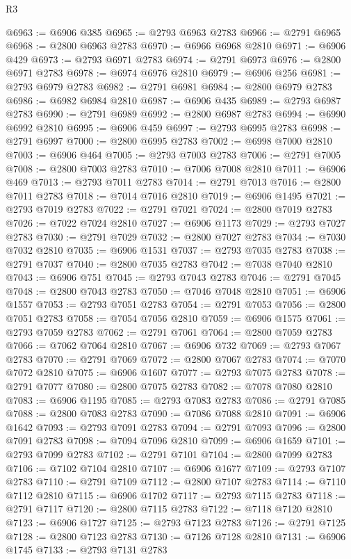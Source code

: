 \begin{lexlean}{R3}
\begin{coremodule}
@6963 := @6906 @385
@6965 := @2793 @6963 @2783
@6966 := @2791 @6965
@6968 := @2800 @6963 @2783
@6970 := @6966 @6968 @2810
@6971 := @6906 @429
@6973 := @2793 @6971 @2783
@6974 := @2791 @6973
@6976 := @2800 @6971 @2783
@6978 := @6974 @6976 @2810
@6979 := @6906 @256
@6981 := @2793 @6979 @2783
@6982 := @2791 @6981
@6984 := @2800 @6979 @2783
@6986 := @6982 @6984 @2810
@6987 := @6906 @435
@6989 := @2793 @6987 @2783
@6990 := @2791 @6989
@6992 := @2800 @6987 @2783
@6994 := @6990 @6992 @2810
@6995 := @6906 @459
@6997 := @2793 @6995 @2783
@6998 := @2791 @6997
@7000 := @2800 @6995 @2783
@7002 := @6998 @7000 @2810
@7003 := @6906 @464
@7005 := @2793 @7003 @2783
@7006 := @2791 @7005
@7008 := @2800 @7003 @2783
@7010 := @7006 @7008 @2810
@7011 := @6906 @469
@7013 := @2793 @7011 @2783
@7014 := @2791 @7013
@7016 := @2800 @7011 @2783
@7018 := @7014 @7016 @2810
@7019 := @6906 @1495
@7021 := @2793 @7019 @2783
@7022 := @2791 @7021
@7024 := @2800 @7019 @2783
@7026 := @7022 @7024 @2810
@7027 := @6906 @1173
@7029 := @2793 @7027 @2783
@7030 := @2791 @7029
@7032 := @2800 @7027 @2783
@7034 := @7030 @7032 @2810
@7035 := @6906 @1531
@7037 := @2793 @7035 @2783
@7038 := @2791 @7037
@7040 := @2800 @7035 @2783
@7042 := @7038 @7040 @2810
@7043 := @6906 @751
@7045 := @2793 @7043 @2783
@7046 := @2791 @7045
@7048 := @2800 @7043 @2783
@7050 := @7046 @7048 @2810
@7051 := @6906 @1557
@7053 := @2793 @7051 @2783
@7054 := @2791 @7053
@7056 := @2800 @7051 @2783
@7058 := @7054 @7056 @2810
@7059 := @6906 @1575
@7061 := @2793 @7059 @2783
@7062 := @2791 @7061
@7064 := @2800 @7059 @2783
@7066 := @7062 @7064 @2810
@7067 := @6906 @732
@7069 := @2793 @7067 @2783
@7070 := @2791 @7069
@7072 := @2800 @7067 @2783
@7074 := @7070 @7072 @2810
@7075 := @6906 @1607
@7077 := @2793 @7075 @2783
@7078 := @2791 @7077
@7080 := @2800 @7075 @2783
@7082 := @7078 @7080 @2810
@7083 := @6906 @1195
@7085 := @2793 @7083 @2783
@7086 := @2791 @7085
@7088 := @2800 @7083 @2783
@7090 := @7086 @7088 @2810
@7091 := @6906 @1642
@7093 := @2793 @7091 @2783
@7094 := @2791 @7093
@7096 := @2800 @7091 @2783
@7098 := @7094 @7096 @2810
@7099 := @6906 @1659
@7101 := @2793 @7099 @2783
@7102 := @2791 @7101
@7104 := @2800 @7099 @2783
@7106 := @7102 @7104 @2810
@7107 := @6906 @1677
@7109 := @2793 @7107 @2783
@7110 := @2791 @7109
@7112 := @2800 @7107 @2783
@7114 := @7110 @7112 @2810
@7115 := @6906 @1702
@7117 := @2793 @7115 @2783
@7118 := @2791 @7117
@7120 := @2800 @7115 @2783
@7122 := @7118 @7120 @2810
@7123 := @6906 @1727
@7125 := @2793 @7123 @2783
@7126 := @2791 @7125
@7128 := @2800 @7123 @2783
@7130 := @7126 @7128 @2810
@7131 := @6906 @1745
@7133 := @2793 @7131 @2783

\end{coremodule}
\end{lexlean}
